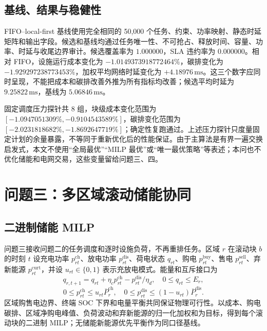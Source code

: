 \subsection{基线、结果与稳健性}

FIFO--local-first 基线使用完全相同的 50,000 个任务、约束、功率映射、静态时延矩阵和输出字段。候选和基线均通过任务唯一性、不可抢占、释放时间、容量、功率、时延与收尾边界审计。候选覆盖率为 $1.000000$，SLA 违约率为 $0.000000$。相对 FIFO，设施运行成本变化为 $-1.0149373918772464\%$，碳排变化为 $-1.929297238773453\%$，加权平均网络时延变化为 $+4.18976\,\mathrm{ms}$。这三个数字应同时呈现，不能把成本和碳排改善外推为所有指标均改善；候选平均时延为 $9.25822\,\mathrm{ms}$，基线为 $5.06846\,\mathrm{ms}$。

固定调度压力探针共 8 组，块级成本变化范围为 $[-1.0947051309\%,-0.9104543589\%]$，碳排变化范围为 $[-2.0231818682\%,-1.8692647719\%]$；确定性复跑通过。上述压力探针只度量固定计划的余量暴露，不等同于重新优化后的性能保证。由于主算法是有界一遍交换启发式，本文不使用“全局最优”“MILP 最优”或“唯一最优策略”等表述；本问也不优化储能和电网交易，这些变量留给问题三、四。

\section{问题三：多区域滚动储能协同}
\label{sec:q3-proposal}

\subsection{二进制储能 MILP}

问题三接收问题二的任务调度和逐时设施负荷，不再重排任务。区域 $r$ 在滚动块 $b$ 的时刻 $t$ 设充电功率 $p^{\mathrm{ch}}_{rt}$、放电功率 $p^{\mathrm{dis}}_{rt}$、荷电状态 $q_{rt}$、购电 $p^{\mathrm{buy}}_{rt}$、售电 $p^{\mathrm{sell}}_{rt}$、弃新能源 $p^{\mathrm{curt}}_{rt}$，并设 $u_{rt}\in\{0,1\}$ 表示充放电模式。能量和互斥接口为
\begin{equation}
  q_{r,t+1}=q_{rt}+\eta_c p^{\mathrm{ch}}_{rt}
  -p^{\mathrm{dis}}_{rt}/\eta_d,
  \quad 0\le q_{rt}\le E_r,
\end{equation}
\begin{equation}
  0\le p^{\mathrm{ch}}_{rt}\le u_{rt}\overline P^{\mathrm{ch}}_r,
  \quad 0\le p^{\mathrm{dis}}_{rt}\le (1-u_{rt})\overline P^{\mathrm{dis}}_r.
\end{equation}
区域购售电边界、终端 SOC 下界和电量平衡共同保证物理可行性。以成本、购电碳排、区域净购电峰值、负荷波动和弃新能源的归一化加权和为目标，得到每个滚动块的二进制 MILP；无储能新能源优先平衡作为同口径基线。


